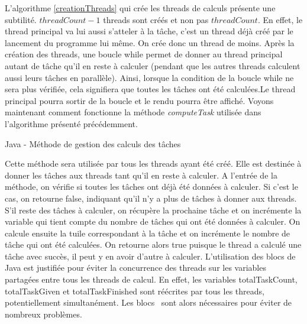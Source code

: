 \documentclass[11pt]{article}
\begin{document}
L'algorithme \ref{creationThreads} qui crée les threads de calculs présente une subtilité. $threadCount-1$ threads sont créés et non pas $threadCount$. En effet, le thread principal va lui aussi s'atteler à la tâche, c'est un thread déjà créé par le lancement du programme lui même. On crée donc un thread de moins. Après la création des threads, une boucle while permet de donner au thread principal autant de tâche qu'il en reste à calculer (pendant que les autres threads calculent aussi leurs tâches en parallèle). Ainsi, lorsque la condition de la boucle while ne sera plus vérifiée, cela signifiera que toutes les tâches ont été calculées.Le thread principal pourra sortir de la boucle et le rendu pourra être affiché. Voyons maintenant comment fonctionne la méthode \textit{computeTask} utilisée dans l'algorithme présenté précédemment.

\begin{algorithm}[H]

	
	
	\caption{Java - Méthode de gestion des calculs des tâches}
	\label{computeTask}
\end{algorithm}

Cette méthode sera utilisée par tous les threads ayant été créé. Elle est destinée à donner les tâches aux threads tant qu'il en reste à calculer. A l'entrée de la méthode, on vérifie si toutes les tâches ont déjà été données à calculer. Si c'est le cas, on retourne false, indiquant qu'il n'y a plus de tâches à donner aux threads. S'il reste des tâches à calculer, on récupère la prochaine tâche et on incrémente la variable qui tient compte du nombre de tâches qui ont été données à calculer. On calcule ensuite la tuile correspondant à la tâche et on incrémente le nombre de tâche qui ont été calculées. On retourne alors true puisque le thread a calculé une tâche avec succès, il peut y en avoir d'autre à calculer. L'utilisation des blocs  \color{black} de Java est justifiée pour éviter la concurrence des threads sur les variables partagées entre tous les threads de calcul. En effet, les variables totalTaskCount, totalTaskGiven et totalTaskFinished sont réécrites par tous les threads, potentiellement simultanément. Les blocs \color{black}\ sont alors nécessaires pour éviter de nombreux problèmes.
\end{document}
